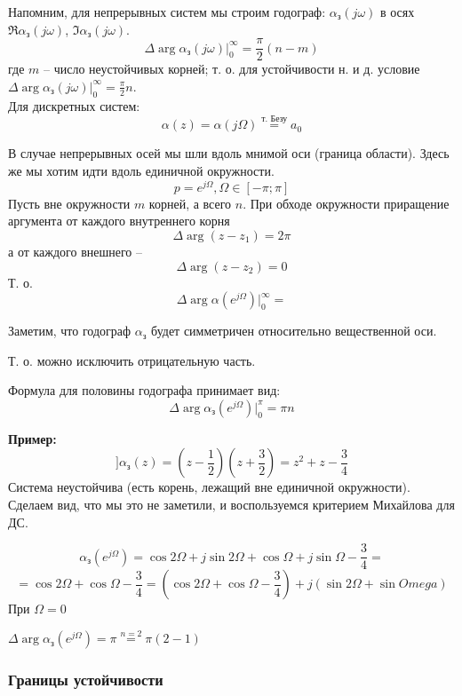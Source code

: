 \documentclass[main.tex]{subfiles}
\begin{document}
Напомним, для непрерывных систем мы строим годограф:  $\alpha_{\text{з}}(j \omega)$ в осях $ \Re \alpha_{\text{з}}(j \omega) $, $ \Im \alpha_{\text{з}}(j \omega) $.
\[ \Delta \arg \alpha_{\text{з}}(j \omega) |_0^\infty = \frac{\pi}{2} (n - m) \]
где $ m $ -- число неустойчивых корней; т. о. для устойчивости н. и д. условие $\Delta \arg \alpha_{\text{з}}(j \omega) |_0^\infty = \frac{\pi}{2} n $. \\

Для дискретных систем:
\[ \alpha(z) = \alpha(j \Omega) \overset{\text{т. Безу}}= a_0  \] %


В случае непрерывных осей мы шли вдоль мнимой оси (граница области).
Здесь же мы хотим идти вдоль единичной окружности.
\[ p = e^{j \Omega}, \Omega \in [- \pi; \pi] \]
Пусть вне окружности $ m $ корней, а всего $ n $.
При обходе окружности приращение аргумента от каждого внутреннего корня
\[ \Delta \arg (z - z_1) = 2 \pi \]
а от каждого внешнего --
\[ \Delta \arg (z - z_2) = 0 \]
Т. о.
\[ \Delta \arg \alpha(e^{j \Omega}) |_0^\infty =  \] %

Заметим, что годограф $ \alpha_{\text{з}} $ будет симметричен относительно вещественной оси.


Т. о. можно исключить отрицательную часть.


Формула для половины годографа принимает вид:
\[ \Delta \arg \alpha_{\text{з}}(e^{j \Omega})|_0^\pi = \pi n \]

\textbf{ Пример: }
\[ ] \alpha_{\text{з}}(z) = \left( z -\frac{1}{2} \right) \left( z + \frac{3}{2} \right) = z^2 + z - \frac{3}{4} \]
Система неустойчива (есть корень, лежащий вне единичной окружности).
Сделаем вид, что мы это не заметили, и воспользуемся критерием Михайлова для ДС.

\[ \alpha_{\text{з}}(e^{j\Omega}) = \cos 2 \Omega + j \sin 2 \Omega + \cos \Omega + j \sin \Omega - \frac{3}{4} = \]
\[ = \cos 2 \Omega + \cos \Omega - \frac{3}{4} = (\cos 2 \Omega + \cos \Omega - \frac{3}{4}) + j (\sin 2 \Omega + \sin Omega) \]
При $ \Omega = 0 $ %

$ \Delta \arg \alpha_{\text{з}}(e^{j \Omega}) = \pi \overset{n=2}= \pi(2-1) $

\subsubsection{ Границы устойчивости }
\end{document}
